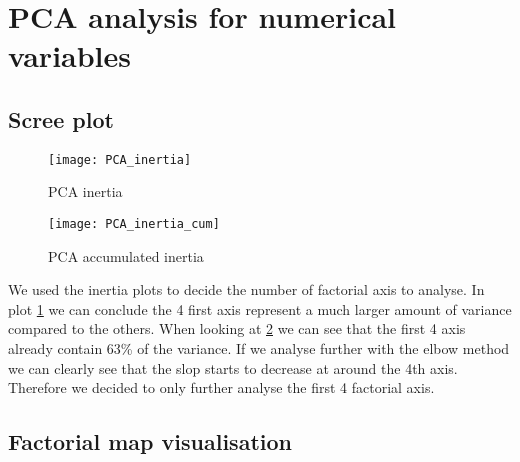 

\section{PCA analysis for numerical variables}%
\label{sec:pca_analysis_for_numerical_variables}

\subsection{Scree plot}%
\label{sub:scree_plot}


\begin{figure}[H]
    \centering
    \texttt{[image: PCA\_inertia]}
    \caption{PCA inertia}%
    \label{fig:pca_inertia}
\end{figure}

\begin{figure}[H]
    \centering
    \texttt{[image: PCA\_inertia\_cum]}
    \caption{PCA accumulated inertia}%
    \label{fig:pca_inertia_cum}
\end{figure}

We used the inertia plots to decide the number of factorial axis to analyse. In plot \ref{fig:pca_inertia} we can conclude the 4 first axis represent a much larger amount of variance compared to the others. When looking at \ref{fig:pca_inertia_cum} we can see that the first 4 axis already contain 63\% of the variance. If we analyse further with the elbow method we can clearly see that the slop starts to decrease at around the 4th axis. Therefore we decided to only further analyse the first 4 factorial axis. 



\subsection{Factorial map visualisation}%
\label{sub:factorial_map_visualisation}

\newcommand{\factorialmap}[3][1]{
    \begin{figure}[H]
        \centering
        \texttt{[image: \#3]}
        \caption{#2}%
        \label{fig:#3-#1}
    \end{figure}
}

